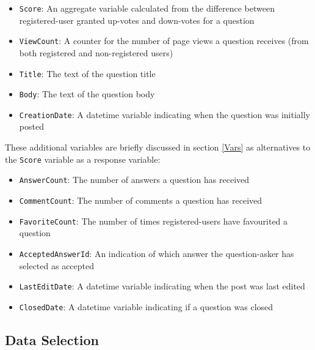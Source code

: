 \documentclass[11pt,preprint, authoryear]{article}
\begin{document}

\begin{itemize}
\item
  \texttt{Score}: An aggregate variable calculated from the difference
  between registered-user granted up-votes and down-votes for a question
\item
  \texttt{ViewCount}: A counter for the number of page views a question
  receives (from both registered and non-registered users)
\item
  \texttt{Title}: The text of the question title
\item
  \texttt{Body}: The text of the question body
\item
  \texttt{CreationDate}: A datetime variable indicating when the
  question was initially posted
\end{itemize}


These additional variables are briefly discussed in section \ref{Vars}
as alternatives to the \texttt{Score} variable as a response variable:


\begin{itemize}
\item
  \texttt{AnswerCount}: The number of answers a question has received
\item
  \texttt{CommentCount}: The number of comments a question has received
\item
  \texttt{FavoriteCount}: The number of times registered-users have
  favourited a question
\item
  \texttt{AcceptedAnswerId}: An indication of which answer the
  question-asker has selected as accepted
\item
  \texttt{LastEditDate}: A datetime variable indicating when the post
  was last edited
\item
  \texttt{ClosedDate}: A datetime variable indicating if a question was
  closed
\end{itemize}


\subsection{\texorpdfstring{Data Selection
\label{selection}}{Data Selection }}\label{data-selection}
\end{document}
